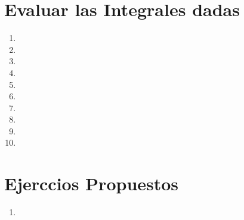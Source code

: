 \documentclass[11pt]{article}
\begin{document}
\section{Evaluar las Integrales dadas}
\begin{enumerate}[resume,label=\textbf{\arabic*.}]
    \item 
    \item 
    \item 
    \item 
    \item 
    \item 
    \item 
    \item 
    \item 
    \item 
\end{enumerate}
\section{Ejerccios Propuestos}
\begin{enumerate}[resume,label=\textbf{\arabic*.}]
    \item 

\end{enumerate}
\end{document}
